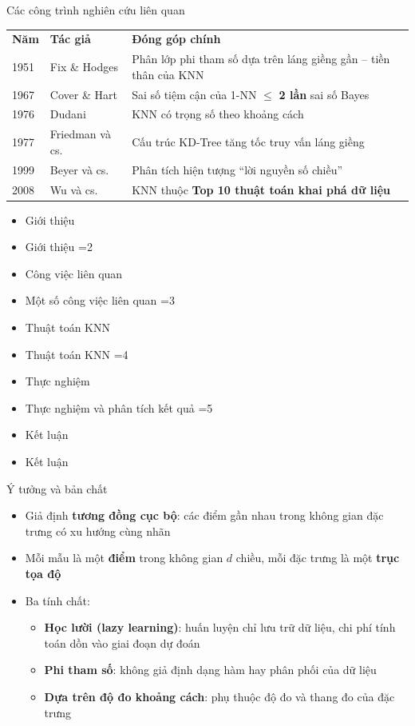 \documentclass[aspectratio=169,10pt]{beamer}
\newcommand{\hl}[1]{\textcolor{nhan}{\textbf{#1}}}
\newcommand{\hx}[1]{\textcolor{xanh}{\textbf{#1}}}
\newcommand{\mucluc}[1]{%
  \begin{frame}[plain]
    \vspace*{1.6cm}
    \begin{itemize}\setlength\itemsep{0.5em}
      \ifnum#1=1 \item {\Huge Giới thiệu}\else \item {\large Giới thiệu}\fi
      \ifnum#1=2 \item {\Huge Công việc liên quan}\else \item {\large Một số công việc liên quan}\fi
      \ifnum#1=3 \item {\Huge Thuật toán KNN}\else \item {\large Thuật toán KNN}\fi
      \ifnum#1=4 \item {\Huge Thực nghiệm}\else \item {\large Thực nghiệm và phân tích kết quả}\fi
      \ifnum#1=5 \item {\Huge Kết luận}\else \item {\large Kết luận}\fi
    \end{itemize}
  \end{frame}}
\begin{document}
\begin{frame}{Các công trình nghiên cứu liên quan}
\small
\renewcommand{\arraystretch}{1.35}
\begin{tabularx}{\linewidth}{@{}l l X@{}}
\rowcolor{bang}\textbf{Năm} & \textbf{Tác giả} & \textbf{Đóng góp chính}\\
1951 & Fix \& Hodges & Phân lớp phi tham số dựa trên láng giềng gần -- tiền thân của KNN\\
1967 & Cover \& Hart & Sai số tiệm cận của 1-NN $\le$ \hl{2 lần} sai số Bayes\\
1976 & Dudani & KNN có trọng số theo khoảng cách\\
1977 & Friedman và cs. & Cấu trúc KD-Tree tăng tốc truy vấn láng giềng\\
1999 & Beyer và cs. & Phân tích hiện tượng “lời nguyền số chiều”\\
2008 & Wu và cs. & KNN thuộc \hx{Top 10 thuật toán khai phá dữ liệu}\\
\end{tabularx}
\end{frame}

\mucluc{3}

\begin{frame}{Ý tưởng và bản chất}
\begin{itemize}\setlength\itemsep{0.6em}
  \item Giả định \hl{tương đồng cục bộ}: các điểm gần nhau trong không gian đặc trưng có xu hướng cùng nhãn
  \item Mỗi mẫu là một \textbf{điểm} trong không gian $d$ chiều, mỗi đặc trưng là một \textbf{trục tọa độ}
  \item Ba tính chất:
  \begin{itemize}\setlength\itemsep{0.3em}
    \item \textbf{Học lười (lazy learning)}: huấn luyện chỉ lưu trữ dữ liệu, chi phí tính toán dồn vào giai đoạn dự đoán
    \item \textbf{Phi tham số}: không giả định dạng hàm hay phân phối của dữ liệu
    \item \textbf{Dựa trên độ đo khoảng cách}: phụ thuộc độ đo và thang đo của đặc trưng
  \end{itemize}
\end{itemize}
\end{frame}
\end{document}

